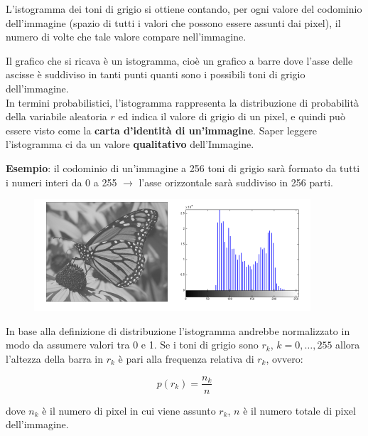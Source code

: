 \begin{definition}
    L'istogramma dei toni di grigio si ottiene contando, per ogni valore del
    codominio dell'immagine (spazio di tutti i valori che possono essere assunti
    dai pixel), il numero di volte che tale valore compare nell'immagine.
\end{definition}

Il grafico che si ricava è un istogramma, cioè un grafico a barre dove l'asse delle ascisse è suddiviso in tanti punti quanti sono i
possibili toni di grigio dell'immagine.\\

In termini probabilistici, l'istogramma rappresenta la distribuzione di probabilità della variabile
aleatoria $r$ ed indica il valore di grigio di un pixel, e quindi può essere visto come
la \textbf{carta d'identità di un'immagine}. Saper leggere l'istogramma ci
da un valore \textbf{qualitativo} dell'Immagine.

\begin{trivlist}
    \item \textbf{Esempio}: il codominio di un'immagine a 256 toni di grigio sarà formato da tutti i numeri interi da 0 a 255 $\rightarrow$ l'asse orizzontale sarà suddiviso in 256 parti.
\end{trivlist}

\begin{figure}[H]
    \centering
    \includegraphics[width=\linewidth, keepaspectratio]{capitoli/immagini/imgs/esempio-istogramma.png}
\end{figure}

\begin{definition}
    In base alla definizione di distribuzione l'istogramma andrebbe normalizzato
    in modo da assumere valori tra 0 e 1. Se i toni di grigio sono $r_k$, $k =
        0, \ldots, 255$ allora l'altezza della barra in $r_k$ è pari alla frequenza
    relativa di $r_k$, ovvero:

    $$
        p(r_k) = \frac{n_k}{n}
    $$

    dove $n_k$ è il numero di pixel in cui viene assunto $r_k$, $n$ è il numero
    totale di pixel dell'immagine.
\end{definition}

